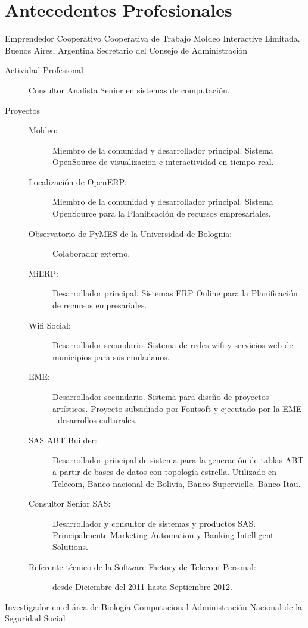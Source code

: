 \section{Antecedentes Profesionales}\label{profesional:desde}

	{Emprendedor Cooperativo}
	{Cooperativa de Trabajo Moldeo Interactive Limitada.}
	{Buenos Aires, Argentina}
	{Secretario del Consejo de Administración}
	{\begin{description}
	\item [Actividad Profesional] Consultor Analista Senior en sistemas de computación.
	\item [Proyectos]
	\begin{description}
		\item [Moldeo:] Miembro de la comunidad y desarrollador principal. Sistema OpenSource de visualizacion e interactividad en tiempo real.
		\item [Localización de OpenERP:] Miembro de la comunidad y desarrollador principal. Sistema OpenSource para la Planificación de recursos empresariales.
		\item [Observatorio de PyMES de la Universidad de Bolognia:] Colaborador externo.
		\item [MiERP:] Desarrollador principal. Sistemas ERP Online para la Planificación de recursos empresariales.
		\item [Wifi Social:] Desarrollador secundario. Sistema de redes wifi y servicios web de municipios para sus ciudadanos.
		\item [EME:] Desarrollador secundario. Sistema para diseño de proyectos artísticos. Proyecto subsidiado por Fontsoft y ejecutado por la EME - desarrollos culturales.
		\item [SAS ABT Builder:] Desarrollador principal de sistema para la generación de
			tablas ABT a partir de bases de datos con topología estrella. Utilizado
			en Telecom, Banco nacional de Bolivia, Banco Supervielle, Banco Itau.
		\item [Consultor Senior SAS:] Desarrollador y consultor de sistemas y productos SAS. Principalmente Marketing Automation y Banking Intelligent Solutions.
		\item [Referente técnico de la Software Factory de Telecom Personal:] desde Diciembre del 2011 hasta Septiembre 2012.
	\end{description}
	\end{description}}
	{Investigador en el área de Biología Computacional}
	{Administración Nacional de la Seguridad Social}
